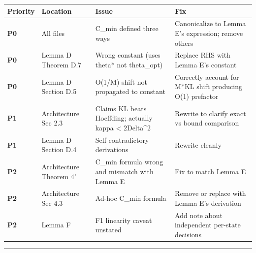 \documentclass[
  12pt,
]{ctexart}
\begin{document}
\begin{longtable}[]{@{}
  >{\raggedright\arraybackslash}p{}
  >{\raggedright\arraybackslash}p{}
  >{\raggedright\arraybackslash}p{}
  >{\raggedright\arraybackslash}p{}@{}}
\toprule\noalign{}
\begin{minipage}[b]{\linewidth}\raggedright
Priority
\end{minipage} & \begin{minipage}[b]{\linewidth}\raggedright
Location
\end{minipage} & \begin{minipage}[b]{\linewidth}\raggedright
Issue
\end{minipage} & \begin{minipage}[b]{\linewidth}\raggedright
Fix
\end{minipage} \\
\midrule\noalign{}
\endhead
\bottomrule\noalign{}
\endlastfoot
\textbf{P0} & All files & C\_min defined three ways & Canonicalize to
Lemma E's expression; remove others \\
\textbf{P0} & Lemma D Theorem D.7 & Wrong constant (uses theta* not
theta\_opt) & Replace RHS with Lemma E's constant \\
\textbf{P0} & Lemma D Section D.5 & O(1/M) shift not propagated to
constant & Correctly account for M*KL shift producing O(1) prefactor \\
\textbf{P1} & Architecture Sec 2.3 & Claims KL beats Hoeffding; actually
kappa \textless{} 2Delta\^{}2 & Rewrite to clarify exact vs bound
comparison \\
\textbf{P1} & Lemma D Section D.4 & Self-contradictory derivations &
Rewrite cleanly \\
\textbf{P2} & Architecture Theorem 4' & C\_min formula wrong and
mismatch with Lemma E & Fix to match Lemma E \\
\textbf{P2} & Architecture Sec 4.3 & Ad-hoc C\_min formula & Remove or
replace with Lemma E's derivation \\
\textbf{P2} & Lemma F & F1 linearity caveat unstated & Add note about
independent per-state decisions \\
\end{longtable}

\begin{center}\rule{0.5\linewidth}{0.5pt}\end{center}
\end{document}
